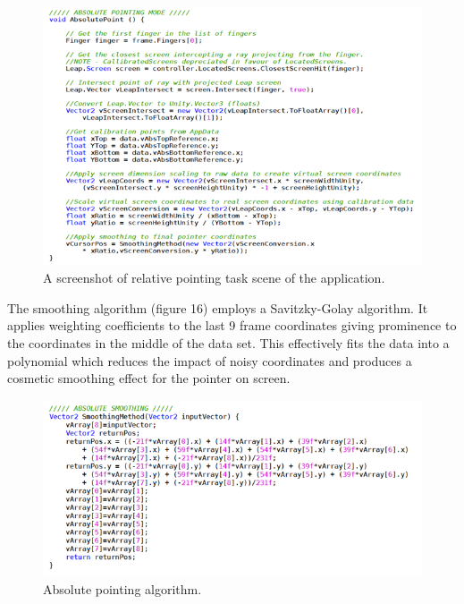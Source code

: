 \documentclass[titlepage]{article}
\begin{document}
\begin{figure}[!h]
    \centering
    \includegraphics[width=7.0in]{Figure_14}
    \caption{A screenshot of relative pointing task scene of the application.}
\end{figure}

The smoothing algorithm (figure 16) employs a Savitzky-Golay algorithm. It applies
weighting coefficients to the last 9 frame coordinates giving prominence to the coordinates in the middle of the data set. This effectively fits the data into a polynomial which reduces the impact of noisy coordinates and produces a cosmetic smoothing effect for the pointer on screen.

\begin{figure}[!h]
    \centering
    \includegraphics[width=7.0in]{Figure_15}
    \caption{Absolute pointing algorithm.}
\end{figure}
\end{document}
